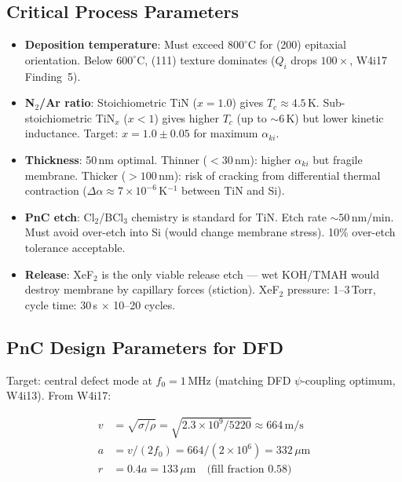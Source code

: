 \documentclass[11pt]{article}
\theoremstyle{remark}
\newcommand{\ee}[1]{\times 10^{#1}}
\begin{document}
\subsection{Critical Process Parameters}

\begin{itemize}[nosep]
  \item \textbf{Deposition temperature}: Must exceed $800^\circ$C for
    (200) epitaxial orientation. Below $600^\circ$C, (111) texture
    dominates ($Q_i$ drops $100\times$, W4i17 Finding~5).
  \item \textbf{N$_2$/Ar ratio}: Stoichiometric TiN ($x = 1.0$) gives
    $T_c \approx 4.5$\,K. Sub-stoichiometric TiN$_x$ ($x < 1$) gives
    higher $T_c$ (up to $\sim 6$\,K) but lower kinetic inductance.
    Target: $x = 1.0 \pm 0.05$ for maximum $\alpha_{ki}$.
  \item \textbf{Thickness}: 50\,nm optimal. Thinner ($< 30$\,nm):
    higher $\alpha_{ki}$ but fragile membrane. Thicker ($> 100$\,nm):
    risk of cracking from differential thermal contraction
    ($\Delta\alpha \approx 7\ee{-6}$\,K$^{-1}$ between TiN and Si).
  \item \textbf{PnC etch}: Cl$_2$/BCl$_3$ chemistry is standard for
    TiN. Etch rate $\sim 50$\,nm/min. Must avoid over-etch into Si
    (would change membrane stress). 10\% over-etch tolerance acceptable.
  \item \textbf{Release}: XeF$_2$ is the only viable release etch ---
    wet KOH/TMAH would destroy membrane by capillary forces (stiction).
    XeF$_2$ pressure: 1--3\,Torr, cycle time: 30\,s $\times$ 10--20
    cycles.
\end{itemize}

\subsection{PnC Design Parameters for DFD}

Target: central defect mode at $f_0 = 1$\,MHz (matching DFD
$\psi$-coupling optimum, W4i13). From W4i17:

\begin{align}
  v &= \sqrt{\sigma/\rho} = \sqrt{2.3\ee{9}/5220} \approx 664\,\text{m/s}
    \label{eq:soundvel} \\
  a &= v/(2f_0) = 664/(2 \times 10^6) = 332\,\mu\text{m}
    \label{eq:pitch} \\
  r &= 0.4a = 133\,\mu\text{m} \quad \text{(fill fraction 0.58)}
    \label{eq:radius}
\end{align}
\end{document}
